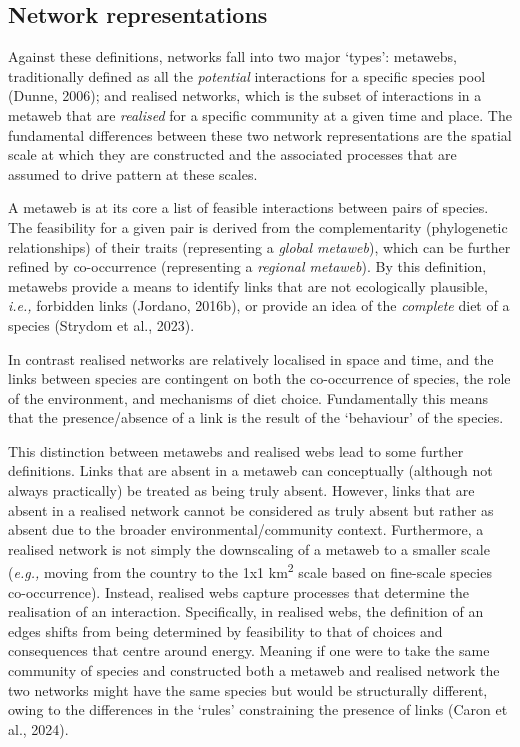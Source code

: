 \documentclass[
]{article}
\begin{document}
\subsection{Network representations}\label{sec-representation}

Against these definitions, networks fall into two major `types':
metawebs, traditionally defined as all the \emph{potential} interactions
for a specific species pool (Dunne, 2006); and realised networks, which
is the subset of interactions in a metaweb that are \emph{realised} for
a specific community at a given time and place. The fundamental
differences between these two network representations are the spatial
scale at which they are constructed and the associated processes that
are assumed to drive pattern at these scales.

A metaweb is at its core a list of feasible interactions between pairs
of species. The feasibility for a given pair is derived from the
complementarity (phylogenetic relationships) of their traits
(representing a \emph{global metaweb}), which can be further refined by
co-occurrence (representing a \emph{regional metaweb}). By this
definition, metawebs provide a means to identify links that are not
ecologically plausible, \emph{i.e.,} forbidden links (Jordano, 2016b),
or provide an idea of the \emph{complete} diet of a species (Strydom et
al., 2023).

In contrast realised networks are relatively localised in space and
time, and the links between species are contingent on both the
co-occurrence of species, the role of the environment, and mechanisms of
diet choice. Fundamentally this means that the presence/absence of a
link is the result of the `behaviour' of the species.

This distinction between metawebs and realised webs lead to some further
definitions. Links that are absent in a metaweb can conceptually
(although not always practically) be treated as being truly absent.
However, links that are absent in a realised network cannot be
considered as truly absent but rather as absent due to the broader
environmental/community context. Furthermore, a realised network is not
simply the downscaling of a metaweb to a smaller scale (\emph{e.g.,}
moving from the country to the 1x1 km\textsuperscript{2} scale based on
fine-scale species co-occurrence). Instead, realised webs capture
processes that determine the realisation of an interaction.
Specifically, in realised webs, the definition of an edges shifts from
being determined by feasibility to that of choices and consequences that
centre around energy. Meaning if one were to take the same community of
species and constructed both a metaweb and realised network the two
networks might have the same species but would be structurally
different, owing to the differences in the `rules' constraining the
presence of links (Caron et al., 2024).
\end{document}
